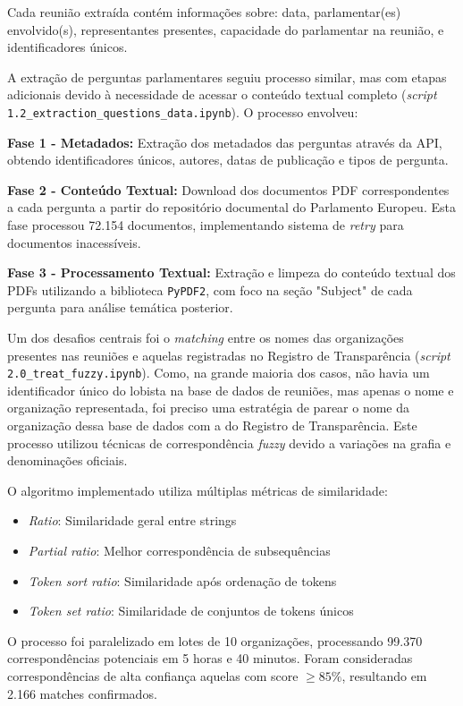 Cada reunião extraída contém informações sobre: data, parlamentar(es) envolvido(s), representantes presentes, capacidade do parlamentar na reunião, e identificadores únicos.

A extração de perguntas parlamentares seguiu processo similar, mas com etapas adicionais devido à necessidade de acessar o conteúdo textual completo (\textit{script} \texttt{1.2\_extraction\_questions\_data.ipynb}). O processo envolveu:

\textbf{Fase 1 - Metadados:} Extração dos metadados das perguntas através da API, obtendo identificadores únicos, autores, datas de publicação e tipos de pergunta.

\textbf{Fase 2 - Conteúdo Textual:} Download dos documentos PDF correspondentes a cada pergunta a partir do repositório documental do Parlamento Europeu. Esta fase processou 72.154 documentos, implementando sistema de \textit{retry} para documentos inacessíveis.

\textbf{Fase 3 - Processamento Textual:} Extração e limpeza do conteúdo textual dos PDFs utilizando a biblioteca \texttt{PyPDF2}, com foco na seção "Subject" de cada pergunta para análise temática posterior.

Um dos desafios centrais foi o \textit{matching} entre os nomes das organizações presentes nas reuniões e aquelas registradas no Registro de Transparência (\textit{script} \texttt{2.0\_treat\_fuzzy.ipynb}). Como, na grande maioria dos casos, não havia um identificador único do lobista na base de dados de reuniões, mas apenas o nome e organização representada, foi preciso uma estratégia de parear o nome da organização dessa base de dados com a do Registro de Transparência. Este processo utilizou técnicas de correspondência \textit{fuzzy} devido a variações na grafia e denominações oficiais.

O algoritmo implementado utiliza múltiplas métricas de similaridade:
\begin{itemize}
    \item \textit{Ratio}: Similaridade geral entre strings
    \item \textit{Partial ratio}: Melhor correspondência de subsequências
    \item \textit{Token sort ratio}: Similaridade após ordenação de tokens
    \item \textit{Token set ratio}: Similaridade de conjuntos de tokens únicos
\end{itemize}

O processo foi paralelizado em lotes de 10 organizações, processando 99.370 correspondências potenciais em 5 horas e 40 minutos. Foram consideradas correspondências de alta confiança aquelas com score $\geq 85\%$, resultando em 2.166 matches confirmados.

